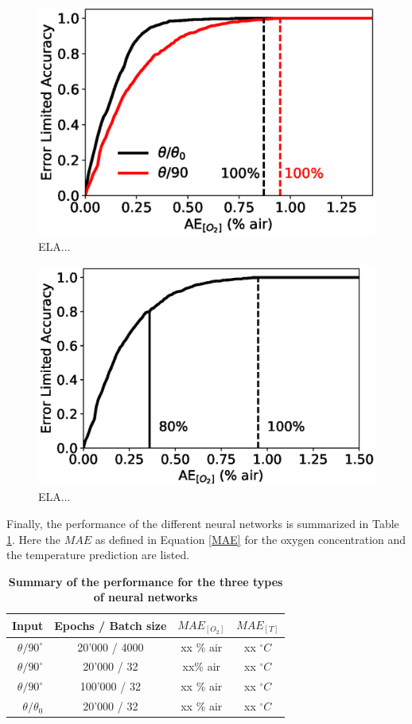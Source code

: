 \documentclass[9pt,twocolumn,twoside,pdftex]{optica}
\begin{document}
\begin{figure}[htbp]
\centering
\includegraphics[width=7 cm]{ELA_comparison.eps}
\caption{ELA...}
\label{fig:result_theta0}
\end{figure}

\begin{figure}[htbp]
\centering
\includegraphics[width=7 cm]{ELA_model_100001_32_1e-3_3x50_2x5_2x5_theta90.eps}
\caption{ELA...}
\label{fig:result_theta0}
\end{figure}




Finally, the performance of the different neural networks is summarized in Table \ref{TableMAE_summary}. Here the $MAE$ as defined in Equation \ref{MAE} for the oxygen concentration and the temperature prediction are listed.

\begin{table}[hbt]
\centering
\caption {\bf Summary of the performance for the three types of neural networks}

\begin{tabular}{ rccc}
\smallskip 
 Input & Epochs / Batch size & $MAE_{[O_2]}$ & $MAE_{[T]}$  \\ 
 \hline
$\theta / 90^\circ$ & 20'000 / 4000 & xx \% air & xx $^\circ C$\\ 
$\theta / 90^\circ$ & 20'000 / 32 & xx\% air & xx $^\circ C$\\ 
$\theta / 90^\circ$& 100'000 / 32 & xx \% air & xx $^\circ C$\\ 
$\theta /\theta_0$ & 20'000 / 32 & xx \% air & xx $^\circ C$\\ 

\end{tabular}
\label{TableMAE_summary}
\end{table}
\end{document}
